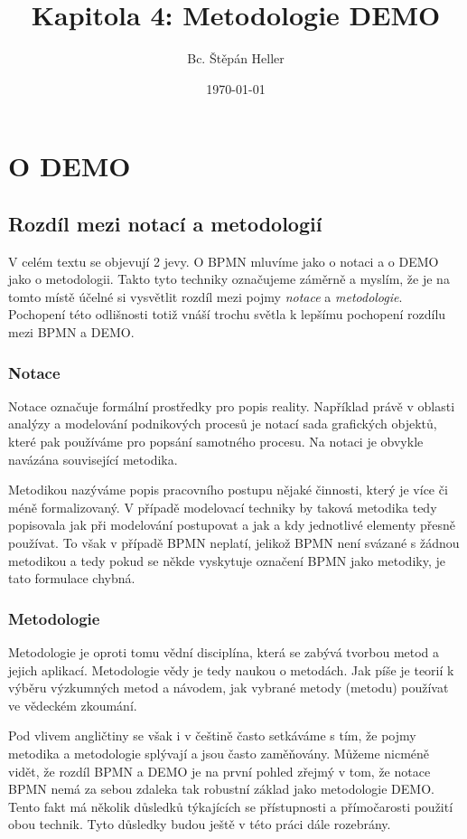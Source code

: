 \documentclass[]{article}
\begin{document}
\title{Kapitola 4: Metodologie DEMO}
\author{Bc. Štěpán Heller}
\date{\today}
\maketitle

\section{O DEMO}
\subsection{Rozdíl mezi notací a metodologií}
V celém textu se objevují 2 jevy. O BPMN mluvíme jako o notaci a o DEMO jako o metodologii. Takto tyto techniky označujeme záměrně a myslím, že je na tomto místě účelné si vysvětlit rozdíl mezi pojmy \textit{notace} a \textit{metodologie}. Pochopení této odlišnosti totiž vnáší trochu světla k lepšímu pochopení rozdílu mezi BPMN a DEMO.

\subsubsection{Notace}
Notace označuje formální prostředky pro popis reality. Například právě v oblasti analýzy a modelování podnikových procesů je notací sada grafických objektů, které pak používáme pro popsání samotného procesu. Na notaci je obvykle navázána související metodika. \cite{Notace}

Metodikou nazýváme popis pracovního postupu nějaké činnosti, který je více či méně formalizovaný. \cite{Metodika} V případě modelovací techniky by taková metodika tedy popisovala jak při modelování postupovat a jak a kdy jednotlivé elementy přesně používat. To však v případě BPMN neplatí, jelikož BPMN není svázané s žádnou metodikou \cite{Vasicek2008} a tedy pokud se někde vyskytuje označení BPMN jako metodiky, je tato formulace chybná.

\subsubsection{Metodologie}
Metodologie je oproti tomu vědní disciplína, která se zabývá tvorbou metod a jejich aplikací. Metodologie vědy je tedy naukou o metodách. Jak píše \cite{Ochrana2009} je teorií k výběru výzkumných metod a návodem, jak vybrané metody (metodu) používat ve vědeckém zkoumání.

Pod vlivem angličtiny se však i v češtině často setkáváme s tím, že pojmy metodika a metodologie splývají a jsou často zaměňovány. Můžeme nicméně vidět, že rozdíl BPMN a DEMO je na první pohled zřejmý v tom, že notace BPMN nemá za sebou zdaleka tak robustní základ jako metodologie DEMO. Tento fakt má několik důsledků týkajících se přístupnosti a přímočarosti použití obou technik. Tyto důsledky budou ještě v této práci dále rozebrány.
\end{document}
